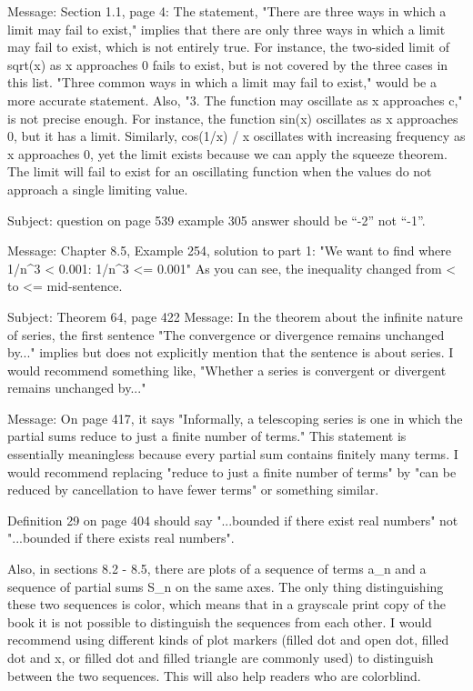 {Message: Section 1.1, page 4: The statement, "There are three ways in which a limit may fail to exist," implies that there are only three ways in which a limit may fail to exist, which is not entirely true. For instance, the two-sided limit of sqrt(x) as x approaches 0 fails to exist, but is not covered by the three cases in this list. "Three common ways in which a limit may fail to exist," would be a more accurate statement. Also,   
"3. The function may oscillate as x approaches c," is not precise enough. For instance, the function sin(x) oscillates as x approaches 0, but it has a limit. Similarly, cos(1/x) / x oscillates with increasing frequency as x approaches 0, yet the limit exists because we can apply the squeeze theorem. The limit will fail to exist for an oscillating function when the values do not approach a single limiting value.

Subject: question on page 539 example 305     answer should be ``-2'' not ``-1''.

Message: Chapter 8.5, Example 254, solution to part 1: "We want to find where 1/n^3 < 0.001: 1/n^3 <= 0.001" As you can see, the inequality changed from < to <= mid-sentence.

Subject: Theorem 64, page 422
Message: In the theorem about the infinite nature of series, the first sentence "The convergence or divergence remains unchanged by..." implies but does not explicitly mention that the sentence is about series. I would recommend something like, "Whether a series is convergent or divergent remains unchanged by..."

Message: On page 417, it says "Informally, a telescoping series is one in which the partial sums reduce to just a finite number of terms." This statement is essentially meaningless because every partial sum contains finitely many terms. I would recommend replacing "reduce to just a finite number of terms" by "can be reduced by cancellation to have fewer terms" or something similar.

Definition 29 on page 404 should say "...bounded if there exist real numbers" not "...bounded if there exists real numbers".

Also, in sections 8.2 - 8.5, there are plots of a sequence of terms a_n and a sequence of partial sums S_n on the same axes. The only thing distinguishing these two sequences is color, which means that in a grayscale print copy of the book it is not possible to distinguish the sequences from each other. I would recommend using different kinds of plot markers (filled dot and open dot, filled dot and x, or filled dot and filled triangle are commonly used) to distinguish between the two sequences. This will also help readers who are colorblind.

}
